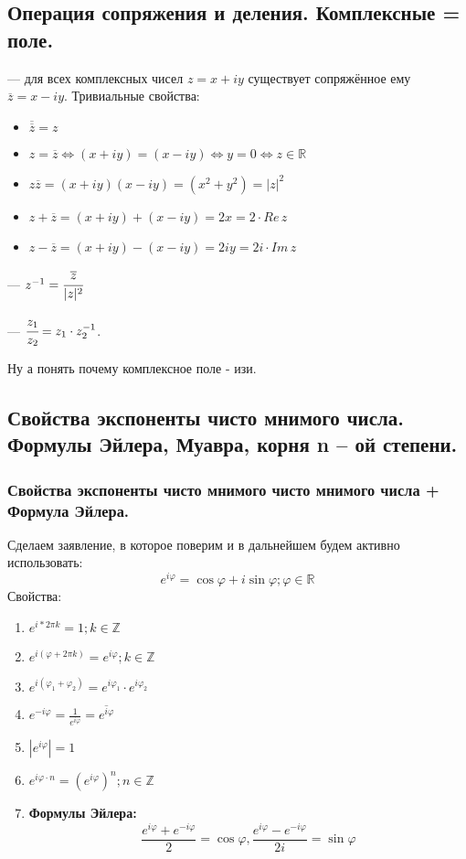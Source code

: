 \subsection{Операция сопряжения и деления. Комплексные = поле.}

 --- для всех комплексных чисел $z=x+iy$ существует  сопряжённое ему $\overline{z}=x-iy$. Тривиальные свойства:
          \begin{itemize}
              \item $\overline{\overline{z}} = z$
              \item $z=\overline{z} \Leftrightarrow (x+iy)=(x-iy) \Leftrightarrow y=0 \Leftrightarrow z\in \mathbb{R}$
              \item $z\overline{z}=(x + iy)(x - iy)=(x^2 + y^2)=|z|^2$
              \item $z+\overline{z}=(x + iy) + (x - iy)= 2x = 2 \cdot Re\,z$
              \item $z-\overline{z}=(x + iy) - (x - iy)= 2iy = 2i \cdot Im\,z$
          \end{itemize}
 --- $z^{-1}=\cfrac{\overline{z}}{|z|^2}$

 --- $\cfrac{z_1}{z_2} = z_1 \cdot z_2^{-1}$.

Ну а понять почему комплексное поле - изи. 

\subsection{Свойства экспоненты чисто мнимого числа. Формулы Эйлера, Муавра, корня n – ой степени.}

\subsubsection{Свойства экспоненты чисто мнимого чисто мнимого числа + Формула Эйлера.}

Сделаем заявление, в которое поверим и в дальнейшем будем активно использовать:
$$e^{i\varphi}=\cos{\varphi} + i\sin{\varphi}; \varphi\in\mathbb{R}$$
Свойства:
\begin{enumerate}
    \item $e^{i*2\pi k} = 1; k\in\mathbb{Z}$
    \item $e^{i(\varphi + 2\pi k)} = e^{i\varphi}; k\in\mathbb{Z}$
    \item $e^{i(\varphi_1 + \varphi_2)} = e^{i\varphi_1} \cdot e^{i\varphi_2}$
    \item $e^{-i\varphi} = \frac{1}{e^{i\varphi}} = \overline{e^{i\varphi}}$
    \item $|e^{i\varphi}| = 1$
    \item $e^{i\varphi \cdot n} = (e^{i\varphi})^n; n\in\mathbb{Z}$
    \item \textbf{Формулы Эйлера:}
          $$\frac{e^{i\varphi}+e^{-i\varphi}}{2}=\cos{\varphi},  \frac{e^{i\varphi}-e^{-i\varphi}}{2i}=\sin{\varphi}$$
\end{enumerate}

